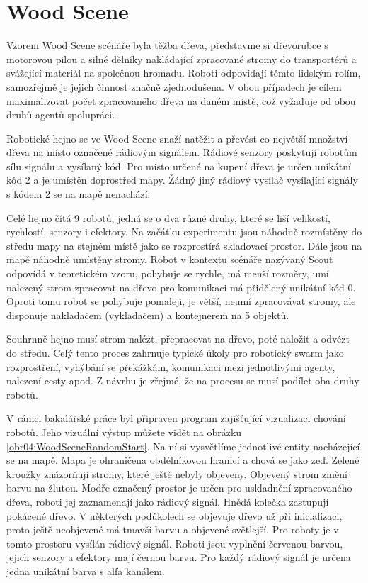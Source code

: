 \section{Wood Scene}
Vzorem Wood Scene scénáře byla těžba dřeva, představme si dřevorubce s motorovou pilou a silné dělníky nakládající zpracované stromy do transportérů a svážející materiál na společnou hromadu. Roboti odpovídají těmto lidským rolím, samozřejmě je jejich činnost značně zjednodušena. V obou případech je cílem maximalizovat počet zpracovaného dřeva na daném místě, což vyžaduje od obou druhů agentů spolupráci. \par
Robotické hejno se ve Wood Scene snaží natěžit a převést co největší množství dřeva na místo označené rádiovým signálem. Rádiové senzory poskytují robotům sílu signálu a vysílaný kód. Pro místo určené na kupení dřeva je určen unikátní kód 2 a je umístěn doprostřed mapy. Žádný jiný rádiový vysílač vysílající signály s kódem 2 se na mapě nenachází.  
\par
Celé hejno čítá 9 robotů, jedná se o dva různé druhy, které se liší velikostí, rychlostí, senzory i efektory. Na začátku experimentu jsou náhodně rozmístěny do středu mapy na stejném místě jako se rozprostírá skladovací prostor. Dále jsou na mapě náhodně umístěny stromy. Robot v kontextu scénáře nazývaný Scout odpovídá  v teoretickém vzoru, pohybuje se rychle, má menší rozměry, umí nalezený strom zpracovat na dřevo pro komunikaci má přidělený unikátní kód 0. Oproti tomu robot  se pohybuje pomaleji, je větší, neumí zpracovávat stromy, ale disponuje nakladačem (vykladačem) a kontejnerem na 5 objektů. 
 \par 
Souhrnně hejno musí strom nalézt, přepracovat na dřevo, poté naložit a odvézt do středu. Celý tento proces zahrnuje typické úkoly pro robotický swarm jako rozprostření, vyhýbání se překážkám, komunikaci mezi jednotlivými agenty, nalezení cesty apod. Z návrhu je zřejmé, že na procesu se musí podílet oba druhy robotů.
\par
V rámci bakalářské práce byl připraven program zajišťující vizualizaci chování robotů. Jeho vizuální výstup můžete vidět na obrázku \ref{obr04:WoodSceneRandomStart}. Na ní si vysvětlíme jednotlivé entity nacházející se na mapě. Mapa je ohraničena obdélníkovou hranicí a chová se jako zeď. Zelené kroužky znázorňují stromy, které ještě nebyly objeveny. Objevený strom změní barvu na žlutou. Modře označený prostor je určen pro uskladnění zpracovaného dřeva, roboti jej zaznamenají jako rádiový signál. Hnědá kolečka zastupují pokácené dřevo. V některých podúkolech se objevuje dřevo už při inicializaci, proto ještě neobjevené má tmavší barvu a objevené světlejší. Pro roboty je v tomto prostoru vysílán rádiový signál. Roboti jsou vyplnění červenou barvou, jejich senzory a efektory mají černou barvu. Pro každý rádiový signál je určena jedna unikátní barva s alfa kanálem. 
